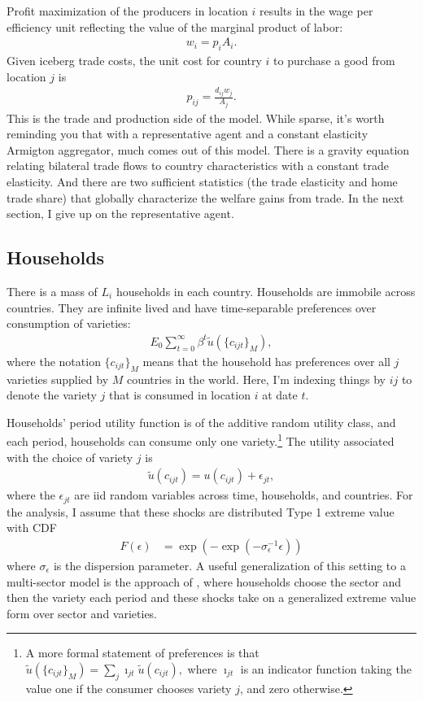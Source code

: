 \documentclass[12pt,pdftex]{article}
\begin{document}
\begin{onehalfspacing}
Profit maximization of the producers in location $i$ results in the wage per efficiency unit reflecting the value of the marginal product of labor:
\begin{align}
w_{i} = p_{i} A_{i}.
\label{eq:marginal-product}
\end{align}
Given iceberg trade costs, the unit cost for country $i$ to purchase a good from location $j$ is
\begin{align}
p_{ij} = \frac{d_{ij}w_{j}}{A_{j}}.
\label{eq:marginal-product-ship}
\end{align}
This is the trade and production side of the model. While sparse, it's worth reminding you that with a representative agent and a constant elasticity Armigton aggregator, much comes out of this model. There is a gravity equation relating bilateral trade flows to country characteristics with a constant trade elasticity. And there are two sufficient statistics (the trade elasticity and home trade share) that globally characterize the welfare gains from trade. In the next section, I give up on the representative agent.

\subsection{Households}

There is a mass of $L_i$ households in each country. Households are immobile across countries. They are infinite lived and have time-separable preferences over consumption of varieties:
\begin{align}
E_{0} \sum_{t = 0}^{\infty} \beta^{t} \tilde{u}( \{ c_{ijt} \}_{M}),
\end{align}
where the notation $\{ c_{ijt} \}_{M}$ means that the household has preferences over all $j$ varieties supplied by $M$ countries in the world. Here, I'm indexing things by $ij$ to denote the variety $j$ that is consumed in location $i$ at date $t$.

Households' period utility function is of the additive random utility class, and each period, households can consume only one variety.\footnote{A more formal statement of preferences is that $\tilde{u}( \{ c_{ijt} \}_{M}) = \sum_j \imath_{jt} \tilde{u}( c_{ijt}),$ where $\imath_{jt}$ is an indicator function taking the value one if the consumer chooses variety $j$, and zero otherwise.} The utility associated with the choice of variety $j$ is
\begin{align}
\tilde{u}( c_{ijt} ) =  u(c_{ijt}) + \epsilon_{jt}, \label{eq:utility}
\end{align}
where the $\epsilon_{jt}$ are iid random variables across time, households, and countries. For the analysis, I assume that these shocks are distributed Type 1 extreme value with CDF
\begin{align}
F(\epsilon) &= \exp(-\exp(-\sigma_{\epsilon}^{-1}\epsilon))
\end{align}
where $\sigma_{\epsilon}$ is the dispersion parameter. A useful generalization of this setting to a multi-sector model is the approach of \citet{p-iq}, where households choose the sector and then the variety each period and these shocks take on a generalized extreme value form over sector and varieties.


\end{onehalfspacing}
\end{document}
